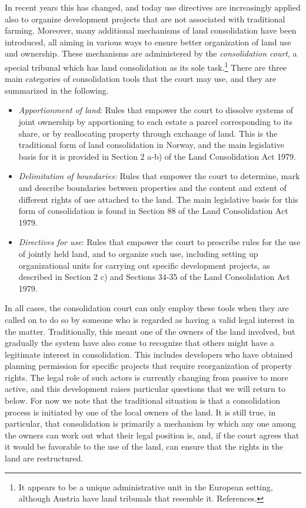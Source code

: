\documentclass[10pt]{article} %
\begin{document}
In recent years this has changed, and today use directives are increasingly applied also to organize development projects that are not associated with traditional farming. Moreover, many additional mechanisms of land consolidation have been introduced, all aiming in various ways to ensure better organization of land use and ownership. These mechanisms are administered by the \emph{consolidation court}, a special tribunal which has land consolidation as its sole task.\footnote{It appears to be a unique administrative unit in the European setting, although Austria have land tribunals that resemble it. References.} There are three main categories of consolidation tools that the court may use, and they are summarized in the following.

\begin{itemize}
\item \emph{Apportionment of land}: Rules that empower the court to dissolve systems of joint ownership by apportioning to each estate a parcel corresponding to its share, or by reallocating property through exchange of land. This is the traditional form of land consolidation in Norway, and the main legislative basis for it is provided in Section 2 a-b) of the Land Consolidation Act 1979.
\item \emph{Delimitation of boundaries:} Rules that empower the court to determine, mark and describe boundaries between properties and the content and extent of different rights of use attached to the land. The main legislative basis for this form of consolidation is found in Section 88 of the Land Consolidation Act 1979.
\item \emph{Directives for use}: Rules that empower the court to prescribe rules for the use of jointly held land, and to organize such use, including setting up organizational units for carrying out specific development projects, as described in Section 2 c) and Sections 34-35 of the Land Consolidation Act 1979. 
\end{itemize}

In all cases, the consolidation court can only employ these tools when they are called on to do so by someone who is regarded as having a valid legal interest in the matter. Traditionally, this meant one of the owners of the land involved, but gradually the system have also come to recognize that others might have a legitimate interest in consolidation. This includes developers who have obtained planning permission for specific projects that require reorganization of property rights. The legal role of such actors is currently changing from passive to more active, and this development raises particular questions that we will return to below. For now we note that the traditional situation is that a consolidation process is initiated by one of the local owners of the land. It is still true, in particular, that consolidation is primarily a mechanism by which any one among the owners can work out what their legal position is, and, if the court agrees that it would be favorable to the use of the land, can ensure that the rights in the land are restructured.
\end{document}
